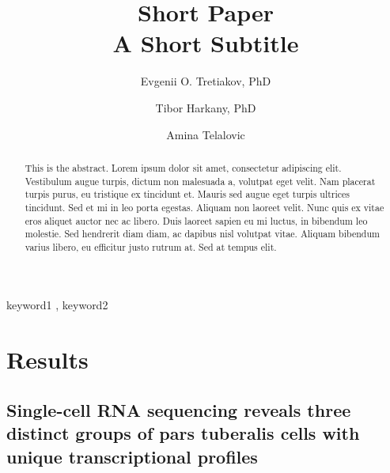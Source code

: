 \documentclass[
  number,
  preprint]{elsarticle}
\begin{document}
\begin{frontmatter}
\title{Short Paper \\\large{A Short Subtitle} }
\author[1]{Evgenii O. Tretiakov, PhD%
%
}
\author[1,2]{Tibor Harkany, PhD%
%
}
\author[1]{Amina Telalovic%
%
}





        
\begin{abstract}
This is the abstract. Lorem ipsum dolor sit amet, consectetur adipiscing
elit. Vestibulum augue turpis, dictum non malesuada a, volutpat eget
velit. Nam placerat turpis purus, eu tristique ex tincidunt et. Mauris
sed augue eget turpis ultrices tincidunt. Sed et mi in leo porta
egestas. Aliquam non laoreet velit. Nunc quis ex vitae eros aliquet
auctor nec ac libero. Duis laoreet sapien eu mi luctus, in bibendum leo
molestie. Sed hendrerit diam diam, ac dapibus nisl volutpat vitae.
Aliquam bibendum varius libero, eu efficitur justo rutrum at. Sed at
tempus elit.
\end{abstract}





\begin{keyword}
    keyword1 \sep 
    keyword2
\end{keyword}
\end{frontmatter}
    

\section{Results}\label{results}

\subsection{\texorpdfstring{\textbf{Single-cell RNA sequencing reveals
three distinct groups of pars tuberalis cells with unique
transcriptional
profiles}}{Single-cell RNA sequencing reveals three distinct groups of pars tuberalis cells with unique transcriptional profiles}}\label{single-cell-rna-sequencing-reveals-three-distinct-groups-of-pars-tuberalis-cells-with-unique-transcriptional-profiles}
\end{document}
